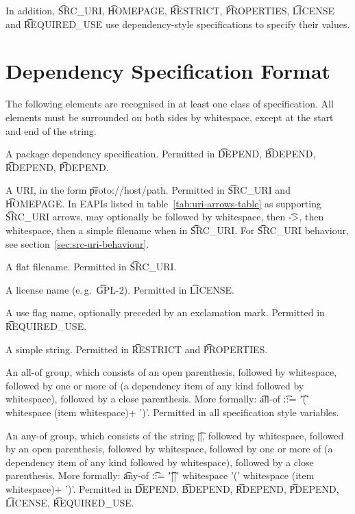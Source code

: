 In addition, \t{SRC_URI}, \t{HOMEPAGE}, \t{RESTRICT}, \t{PROPERTIES}, \t{LICENSE} and
\t{REQUIRED_USE} use dependency-style specifications to specify their values.

\section{Dependency Specification Format}
\label{sec:dependency-spec}

The following elements are recognised in at least one class of specification. All elements must
be surrounded on both sides by whitespace, except at the start and end of the string.

\begin{compactitem}
\item A package dependency specification. Permitted in \t{DEPEND}, \t{BDEPEND}, \t{RDEPEND},
    \t{PDEPEND}.
\item A URI, in the form \t{proto://host/path}. Permitted in \t{SRC_URI} and \t{HOMEPAGE}\@.
    In EAPIs listed in table~\ref{tab:uri-arrows-table} as supporting \t{SRC_URI} arrows, may
    optionally be followed by whitespace, then \t{->}, then whitespace, then a simple filename when
    in \t{SRC_URI}\@. For \t{SRC_URI} behaviour, see section~\ref{sec:src-uri-behaviour}.
\item A flat filename. Permitted in \t{SRC_URI}.
\item A license name (e.\,g.\ \t{GPL-2}). Permitted in \t{LICENSE}.
\item A use flag name, optionally preceded by an exclamation mark. Permitted in \t{REQUIRED_USE}.
\item A simple string. Permitted in \t{RESTRICT} and \t{PROPERTIES}.
\item An all-of group, which consists of an open parenthesis, followed by whitespace,
    followed by one or more of (a dependency item of any kind followed by whitespace), followed
    by a close parenthesis. More formally:
    \t{all-of} \t{::=} \t{'(' whitespace (item whitespace)+ ')'}. Permitted in all specification
    style variables.
\item An any-of group, which consists of the string \t{||}, followed by whitespace,
    followed by an open parenthesis, followed by whitespace, followed by one or more
    of (a dependency item of any kind followed by whitespace), followed by a close parenthesis.
    More formally: \t{any-of} \t{::=} \t{'||' whitespace '(' whitespace (item whitespace)+ ')'}.
    Permitted in \t{DEPEND}, \t{BDEPEND}, \t{RDEPEND}, \t{PDEPEND}, \t{LICENSE}, \t{REQUIRED_USE}.

\end{compactitem}
